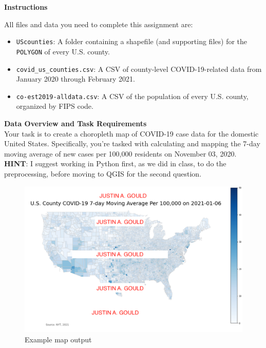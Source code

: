 \documentclass{homework}
\begin{document}
\maketitle


\textbf{Instructions}

All files and data you need to complete this assignment are:
\begin{itemize}
    \item \verb|UScounties|: A folder containing a shapefile (and supporting files) for the \verb|POLYGON| of every U.S. county.
    \item \verb|covid_us_counties.csv|: A CSV of county-level COVID-19-related data from January 2020 through February 2021.
    \item \verb|co-est2019-alldata.csv|: A CSV of the population of every U.S. county, organized by FIPS code.
\end{itemize}

\clearpage


\textbf{Data Overview and Task Requirements}\\
Your task is to create a choropleth map of COVID-19 case data for the domestic United States. Specifically, you're tasked with calculating and mapping the 7-day moving average of new cases per 100,000 residents on November 03, 2020.\\



\textbf{HINT}: I suggest working in Python first, as we did in class, to do the preprocessing, before moving to QGIS for the second question.\\

\begin{figure}
    \includegraphics[width=\linewidth]{./final_map.png}
    \caption{Example map output}
    \label{fig:final_map}
\end{figure}
\end{document}
